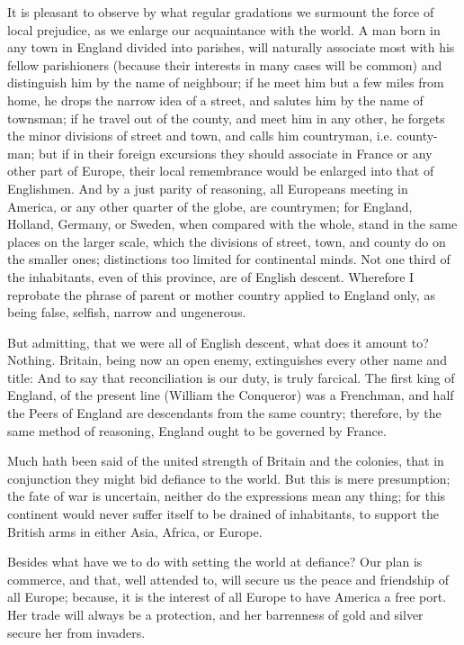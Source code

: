 \documentclass[12pt,oneside]{memoir}
\begin{document}
It is pleasant to observe by what regular gradations we surmount the force of local prejudice, as we enlarge our acquaintance with the world. A man born in any town in England divided into parishes, will naturally associate most with his fellow parishioners (because their interests in many cases will be common) and distinguish him by the name of neighbour; if he meet him but a few miles from home, he drops the narrow idea of a street, and salutes him by the name of townsman; if he travel out of the county, and meet him in any other, he forgets the minor divisions of street and town, and calls him countryman, i.e. county-man; but if in their foreign excursions they should associate in France or any other part of Europe, their local remembrance would be enlarged into that of Englishmen. And by a just parity of reasoning, all Europeans meeting in America, or any other quarter of the globe, are countrymen; for England, Holland, Germany, or Sweden, when compared with the whole, stand in the same places on the larger scale, which the divisions of street, town, and county do on the smaller ones; distinctions too limited for continental minds. Not one third of the inhabitants, even of this province, are of English descent. Wherefore I reprobate the phrase of parent or mother country applied to England only, as being false, selfish, narrow and ungenerous.

But admitting, that we were all of English descent, what does it amount to? Nothing. Britain, being now an open enemy, extinguishes every other name and title: And to say that reconciliation is our duty, is truly farcical. The first king of England, of the present line (William the Conqueror) was a Frenchman, and half the Peers of England are descendants from the same country; therefore, by the same method of reasoning, England ought to be governed by France.

Much hath been said of the united strength of Britain and the colonies, that in conjunction they might bid defiance to the world. But this is mere presumption; the fate of war is uncertain, neither do the expressions mean any thing; for this continent would never suffer itself to be drained of inhabitants, to support the British arms in either Asia, Africa, or Europe.

Besides what have we to do with setting the world at defiance? Our plan is commerce, and that, well attended to, will secure us the peace and friendship of all Europe; because, it is the interest of all Europe to have America a free port. Her trade will always be a protection, and her barrenness of gold and silver secure her from invaders.
\end{document}
